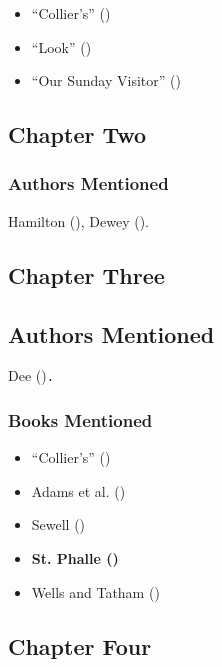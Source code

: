 \documentclass[
  11pt,
]{article}
\providecommand{\tightlist}{%
  \setlength{\itemsep}{0pt}\setlength{\parskip}{0pt}}
\begin{document}
\begin{itemize}
\tightlist
\item
  {``Collier's''} ()
\item
  {``Look''} ()
\item
  {``Our Sunday Visitor''} ()
\end{itemize}

\subsection{Chapter Two}\label{chapter-two}

\subsubsection{Authors Mentioned}\label{authors-mentioned-1}

Hamilton (), Dewey
().

\subsection{Chapter Three}\label{chapter-three}

\subsection{Authors Mentioned}\label{authors-mentioned-2}

Dee ()\texttt{.}

\subsubsection{Books Mentioned}\label{books-mentioned-1}

\begin{itemize}
\tightlist
\item
  {``Collier's''} ()
\item
  Adams et al. ()
\item
  Sewell ()
\item
  \textbf{St. Phalle ()}
\item
  Wells and Tatham ()
\end{itemize}

\subsection{Chapter Four}\label{chapter-four}
\end{document}
